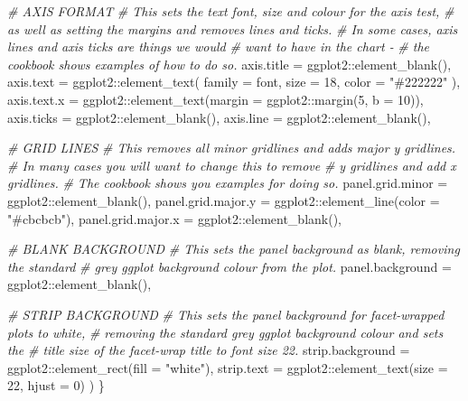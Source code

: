 \documentclass[
]{book}
\newenvironment{Shaded}{\begin{snugshade}}{\end{snugshade}}
\newcommand{\AttributeTok}[1]{\textcolor[rgb]{0.77,0.63,0.00}{#1}}
\newcommand{\CommentTok}[1]{\textcolor[rgb]{0.56,0.35,0.01}{\textit{#1}}}
\newcommand{\DecValTok}[1]{\textcolor[rgb]{0.00,0.00,0.81}{#1}}
\newcommand{\FunctionTok}[1]{\textcolor[rgb]{0.00,0.00,0.00}{#1}}
\newcommand{\NormalTok}[1]{#1}
\newcommand{\SpecialCharTok}[1]{\textcolor[rgb]{0.00,0.00,0.00}{#1}}
\newcommand{\StringTok}[1]{\textcolor[rgb]{0.31,0.60,0.02}{#1}}
\begin{document}
\begin{Shaded}
\begin{Highlighting}[]
    \CommentTok{\# AXIS FORMAT}
    \CommentTok{\# This sets the text font, size and colour for the axis test, }
    \CommentTok{\# as well as setting the margins and removes lines and ticks.}
    \CommentTok{\# In some cases, axis lines and axis ticks are things we would }
    \CommentTok{\# want to have in the chart {-} }
    \CommentTok{\# the cookbook shows examples of how to do so.}
    \AttributeTok{axis.title =}\NormalTok{ ggplot2}\SpecialCharTok{::}\FunctionTok{element\_blank}\NormalTok{(),}
    \AttributeTok{axis.text =}\NormalTok{ ggplot2}\SpecialCharTok{::}\FunctionTok{element\_text}\NormalTok{(}
      \AttributeTok{family =}\NormalTok{ font,}
      \AttributeTok{size =} \DecValTok{18}\NormalTok{,}
      \AttributeTok{color =} \StringTok{"\#222222"}
\NormalTok{    ),}
    \AttributeTok{axis.text.x =}\NormalTok{ ggplot2}\SpecialCharTok{::}\FunctionTok{element\_text}\NormalTok{(}\AttributeTok{margin =}\NormalTok{ ggplot2}\SpecialCharTok{::}\FunctionTok{margin}\NormalTok{(}\DecValTok{5}\NormalTok{, }\AttributeTok{b =} \DecValTok{10}\NormalTok{)),}
    \AttributeTok{axis.ticks =}\NormalTok{ ggplot2}\SpecialCharTok{::}\FunctionTok{element\_blank}\NormalTok{(),}
    \AttributeTok{axis.line =}\NormalTok{ ggplot2}\SpecialCharTok{::}\FunctionTok{element\_blank}\NormalTok{(),}
    
    \CommentTok{\# GRID LINES}
    \CommentTok{\# This removes all minor gridlines and adds major y gridlines.}
    \CommentTok{\# In many cases you will want to change this to remove }
    \CommentTok{\# y gridlines and add x gridlines.}
    \CommentTok{\# The cookbook shows you examples for doing so.}
    \AttributeTok{panel.grid.minor =}\NormalTok{ ggplot2}\SpecialCharTok{::}\FunctionTok{element\_blank}\NormalTok{(),}
    \AttributeTok{panel.grid.major.y =}\NormalTok{ ggplot2}\SpecialCharTok{::}\FunctionTok{element\_line}\NormalTok{(}\AttributeTok{color =} \StringTok{"\#cbcbcb"}\NormalTok{),}
    \AttributeTok{panel.grid.major.x =}\NormalTok{ ggplot2}\SpecialCharTok{::}\FunctionTok{element\_blank}\NormalTok{(),}
    
    \CommentTok{\# BLANK BACKGROUND}
    \CommentTok{\# This sets the panel background as blank, removing the standard }
    \CommentTok{\# grey ggplot background colour from the plot.}
    \AttributeTok{panel.background =}\NormalTok{ ggplot2}\SpecialCharTok{::}\FunctionTok{element\_blank}\NormalTok{(),}
    
    \CommentTok{\# STRIP BACKGROUND}
    \CommentTok{\# This sets the panel background for facet{-}wrapped plots to white,}
    \CommentTok{\# removing the standard grey ggplot background colour and sets the }
    \CommentTok{\# title size of the facet{-}wrap title to font size 22.}
    \AttributeTok{strip.background =}\NormalTok{ ggplot2}\SpecialCharTok{::}\FunctionTok{element\_rect}\NormalTok{(}\AttributeTok{fill =} \StringTok{"white"}\NormalTok{),}
    \AttributeTok{strip.text =}\NormalTok{ ggplot2}\SpecialCharTok{::}\FunctionTok{element\_text}\NormalTok{(}\AttributeTok{size =} \DecValTok{22}\NormalTok{, }\AttributeTok{hjust =} \DecValTok{0}\NormalTok{)}
\NormalTok{  )}
\NormalTok{\}}
\end{Highlighting}
\end{Shaded}
\end{document}
